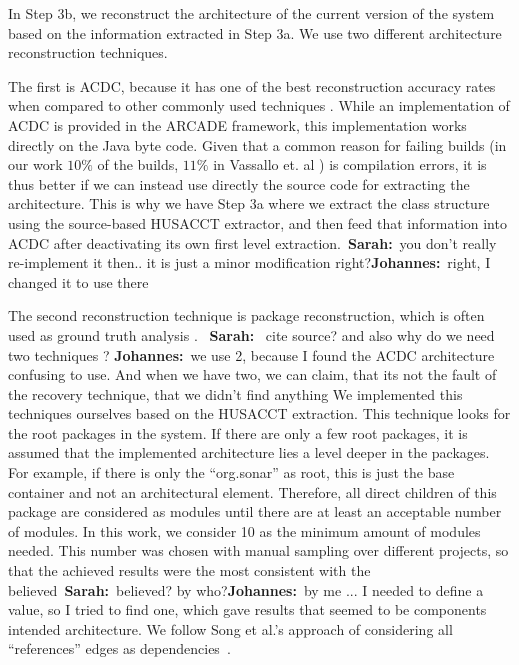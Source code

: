 \documentclass[sigplan, anonymous, review]{acmart}
\newcommand{\sn}[1]{{\color{blue}\textbf{Sarah:}~#1}}
\newcommand{\jk}[1]{{\color{violet}\textbf{Johannes:}~#1}}
\begin{document}


In Step 3b, we reconstruct the architecture of the current version of the system based on the information extracted in Step 3a. We use two different architecture reconstruction techniques.

The first is ACDC, because it has one of the best reconstruction accuracy rates when compared to other commonly used techniques \cite{arcRec-comparison}. 
While an implementation of ACDC is provided in the ARCADE framework, this implementation works directly on the Java byte code.  Given that a common reason for failing builds (in our work $10\%$ of the builds, $11\%$ in Vassallo et. al \cite{CIFailTypes}) is compilation errors, it is thus better if we can instead use directly the source code for extracting the architecture. This is why we have Step 3a where we extract the class structure using the source-based HUSACCT extractor, and then feed that information into ACDC after deactivating its own first level extraction.~\sn{you don't really re-implement it then.. it is just a minor modification right?}\jk{right, I changed it to use there}

The second reconstruction technique is package reconstruction, which is often used as ground truth analysis \cite{arcRec-comparison}. 
~\sn{ cite source? and also why do we need two techniques ?} \jk{we use 2, because I found the ACDC architecture confusing to use. And when we have two, we can claim, that its not the fault of the recovery technique, that we didn't find anything} 
We implemented this techniques ourselves based on the HUSACCT extraction.
This technique looks for the root packages in the system. If there are only a few root packages, it is assumed that the implemented architecture lies a level deeper in the packages. For example, if there is only the ``org.sonar'' as root, this is just the base container and not an architectural element. Therefore, all direct children of this package are considered as modules until there are at least an acceptable number of modules. In this work, we consider 10 as the minimum amount of modules needed. This number was chosen with manual sampling over different projects, so that the achieved results were the most consistent with the believed~\sn{believed? by who?}\jk{by me ... I needed to define a value, so I tried to find one, which gave results that seemed to be components} intended architecture. We follow Song et al.'s approach of considering all ``references'' edges as dependencies~\cite{ArcAsGraph}. 
\end{document}
